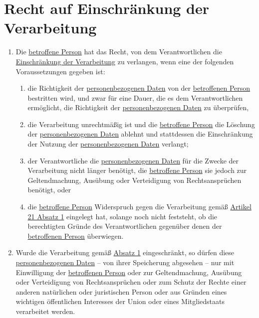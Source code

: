 \chapter{Recht auf Einschränkung der Verarbeitung}
\label{ch:18}


\begin{enumerate}

  \item Die \hyperref[itm:04-1]{betroffene Person} hat das Recht, von dem Verantwortlichen die \hyperref[itm:04-3]{Einschränkung der Verarbeitung} zu verlangen,
   wenn eine der folgenden Voraussetzungen gegeben ist:
  \label{itm:18-1}

  \begin{enumerate}
  
    \item die Richtigkeit der \hyperref[itm:04-1]{personenbezogenen Daten} von der \hyperref[itm:04-1]{betroffenen Person} bestritten wird, und zwar für eine
     Dauer, die es dem Verantwortlichen ermöglicht, die Richtigkeit der \hyperref[itm:04-1]{personenbezogenen Daten} zu überprüfen,
    \label{itm:18-1a}

    \item die Verarbeitung unrechtmäßig ist und die \hyperref[itm:04-1]{betroffene Person} die Löschung der \hyperref[itm:04-1]{personenbezogenen Daten} ablehnt
     und stattdessen die Einschränkung der Nutzung der \hyperref[itm:04-1]{personenbezogenen Daten} verlangt;
    \label{itm:18-1b}

    \item der Verantwortliche die \hyperref[itm:04-1]{personenbezogenen Daten} für die Zwecke der Verarbeitung nicht länger benötigt, die
     \hyperref[itm:04-1]{betroffene Person} sie jedoch zur Geltendmachung, Ausübung oder Verteidigung von Rechtsansprüchen benötigt, oder
    \label{itm:18-1c}

    \item die \hyperref[itm:04-1]{betroffene Person} Widerspruch gegen die Verarbeitung gemäß \hyperref[itm:21-1]{Artikel 21 Absatz 1}
     eingelegt hat, solange noch nicht feststeht, ob die berechtigten Gründe des Verantwortlichen gegenüber denen der
     \hyperref[itm:04-1]{betroffenen Person} überwiegen.
    \label{itm:18-1d}

  \end{enumerate}

  \item Wurde die Verarbeitung gemäß \hyperref[itm:18-1]{Absatz 1} eingeschränkt, so dürfen diese \hyperref[itm:04-1]{personenbezogenen Daten}
   -- von ihrer Speicherung abgesehen -- nur mit Einwilligung der \hyperref[itm:04-1]{betroffenen Person} oder zur Geltendmachung, Ausübung
   oder Verteidigung von Rechtsansprüchen oder zum Schutz der Rechte einer anderen natürlichen oder juristischen
   Person oder aus Gründen eines wichtigen öffentlichen Interesses der Union oder eines Mitgliedstaats verarbeitet
   werden.
  \label{itm:18-2}


\end{enumerate}
